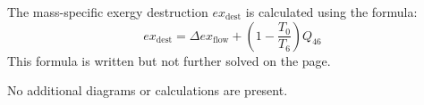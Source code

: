 The mass-specific exergy destruction \( ex_{\text{dest}} \) is calculated using the formula:  
\[
ex_{\text{dest}} = \Delta ex_{\text{flow}} + \left( 1 - \frac{T_0}{T_6} \right) Q_{46}
\]  
This formula is written but not further solved on the page.  

No additional diagrams or calculations are present.